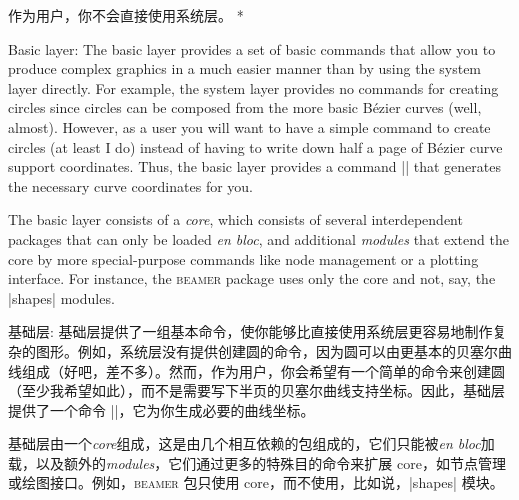 \begin{description}
\begin{paracol}{2}
        作为用户，你不会直接使用系统层。
\switchcolumn[0]*%
    \item[Basic layer:] The basic layer provides a set of basic commands that
        allow you to produce complex graphics in a much easier manner than by
        using the system layer directly. For example, the system layer provides
        no commands for creating circles since circles can be composed from the
        more basic Bézier curves (well, almost). However, as a user you will
        want to have a simple command to create circles (at least I do) instead
        of having to write down half a page of Bézier curve support
        coordinates. Thus, the basic layer provides a command |\pgfpathcircle|
        that generates the necessary curve coordinates for you.


        The basic layer consists of a \emph{core}, which consists of several
        interdependent packages that can only be loaded \emph{en bloc}, and
        additional \emph{modules} that extend the core by more
        special-purpose commands like node management or a plotting
        interface. For instance, the \textsc{beamer} package uses only the
        core and not, say, the |shapes| modules.
\switchcolumn
    \item[基础层:]         
    基础层提供了一组基本命令，使你能够比直接使用系统层更容易地制作复杂的图形。例如，系统层没有提供创建圆的命令，因为圆可以由更基本的贝塞尔曲线组成（好吧，差不多）。然而，作为用户，你会希望有一个简单的命令来创建圆（至少我希望如此），而不是需要写下半页的贝塞尔曲线支持坐标。因此，基础层提供了一个命令 |\pgfpathcircle|，它为你生成必要的曲线坐标。

        基础层由一个\emph{core}组成，这是由几个相互依赖的包组成的，它们只能被\emph{en bloc}加载，以及额外的\emph{modules}，它们通过更多的特殊目的命令来扩展 core，如节点管理或绘图接口。例如，\textsc{beamer} 包只使用 core，而不使用，比如说，|shapes| 模块。
\end{paracol}
\end{description}

